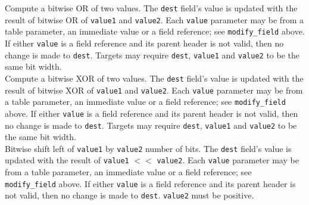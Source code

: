 \documentclass[12pt]{article}
\begin{document}

{ %
Compute a bitwise OR of two values.
}
{ %
}
{ %
The \texttt{dest} field's value is updated with the result of bitwise OR of
\texttt{value1} and \texttt{value2}. Each \texttt{value} parameter may be from a
table parameter, an immediate value or a field reference; see \texttt{modify_field} above. If either \texttt{value}
is a field reference and its parent header is not valid, then no
change is made to \texttt{dest}. 
Targets may require \texttt{dest}, \texttt{value1} and \texttt{value2} to
be the same bit width.
}\\


{ %
Compute a bitwise XOR of two values.
}
{ %
}
{ %
The \texttt{dest} field's value is updated with the result of bitwise XOR of
\texttt{value1} and \texttt{value2}. Each \texttt{value} parameter may be from a
table parameter, an immediate value or a field reference; see \texttt{modify_field} above. If either \texttt{value}
is a field reference and its parent header is not valid, then no
change is made to \texttt{dest}. 
Targets may require \texttt{dest}, \texttt{value1} and \texttt{value2} to
be the same bit width.
}\\


{ %
Bitwise shift left of \texttt{value1} by \texttt{value2} number of bits.
}
{ %
}
{ %
The \texttt{dest} field's value is updated with the result of 
\texttt{value1} $<<$ \texttt{value2}. Each \texttt{value} parameter may be from a
table parameter, an immediate value or a field reference; see \texttt{modify_field} above. If either \texttt{value}
is a field reference and its parent header is not valid, then no
change is made to \texttt{dest}. \texttt{value2} must be positive. 
}\\
\end{document}
